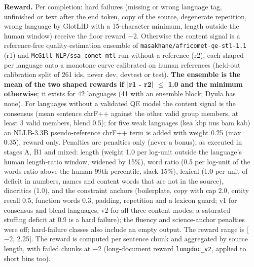 \textbf{Reward.} Per completion: hard failures (missing or wrong language tag, unfinished or text after the end token, copy of the source, degenerate repetition, wrong language by GlotLID \citep{kargaran2023glotlid} with a 15-character minimum, length outside the human window) receive the floor reward \ensuremath{-}2. Otherwise the content signal is a reference-free quality-estimation ensemble of \texttt{masakhane/\allowbreak{}africomet-\allowbreak{}qe-\allowbreak{}stl-\allowbreak{}1.\allowbreak{}1} \citep{wang2024africomet} (r1) and \texttt{McGill-\allowbreak{}NLP/\allowbreak{}ssa-\allowbreak{}comet-\allowbreak{}mtl} run without a reference \citep{li2025ssacomet} (r2), each shaped per language onto a monotone curve calibrated on human references (held-out calibration split of 261 ids, never dev, devtest or test). \textbf{The ensemble is the mean of the two shaped rewards if |r1 - r2| $\le$ 1.0 and the minimum otherwise}; it exists for 42 languages (41 with an ensemble block; Dyula has none). For languages without a validated QE model the content signal is the consensus (mean sentence chrF++ against the other valid group members, at least 3 valid members, blend 0.5); for five weak languages (kea kbp nus bam kab) an NLLB-3.3B pseudo-reference chrF++ term is added with weight 0.25 (max 0.35), reward only. Penalties are penalties only (never a bonus), as executed in stages A, B1 and mixed: length (weight 1.0 per log-unit outside the language's human length-ratio window, widened by 15\%), word ratio (0.5 per log-unit of the words ratio above the human 99th percentile, slack 15\%), lexical (1.0 per unit of deficit in numbers, names and content words that are not in the source), diacritics (1.0), and the constraint anchors (boilerplate, copy with cap 2.0, entity recall 0.5, function words 0.3, padding, repetition and a lexicon guard; v1 for consensus and blend languages, v2 for all three content modes; a saturated stuffing deficit at 0.9 is a hard failure); the fluency and science-anchor penalties were off; hard-failure classes also include an empty output. The reward range is [\ensuremath{-}2, 2.25]. The reward is computed per sentence chunk and aggregated by source length, with failed chunks at \ensuremath{-}2 (long-document reward \texttt{longdoc\_\allowbreak{}v2}, applied to short bins too). 

